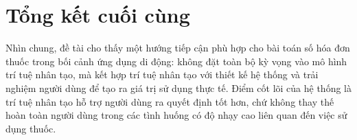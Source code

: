 \documentclass[12pt,a4paper]{report}
\begin{document}
\section{Tổng kết cuối cùng}

Nhìn chung, đề tài cho thấy một hướng tiếp cận phù hợp cho bài toán số hóa đơn thuốc trong bối cảnh ứng dụng di động: không đặt toàn bộ kỳ vọng vào mô hình trí tuệ nhân tạo, mà kết hợp trí tuệ nhân tạo với thiết kế hệ thống và trải nghiệm người dùng để tạo ra giá trị sử dụng thực tế. Điểm cốt lõi của hệ thống là trí tuệ nhân tạo hỗ trợ người dùng ra quyết định tốt hơn, chứ không thay thế hoàn toàn người dùng trong các tình huống có độ nhạy cao liên quan đến việc sử dụng thuốc.

\clearpage

{}
\end{document}
